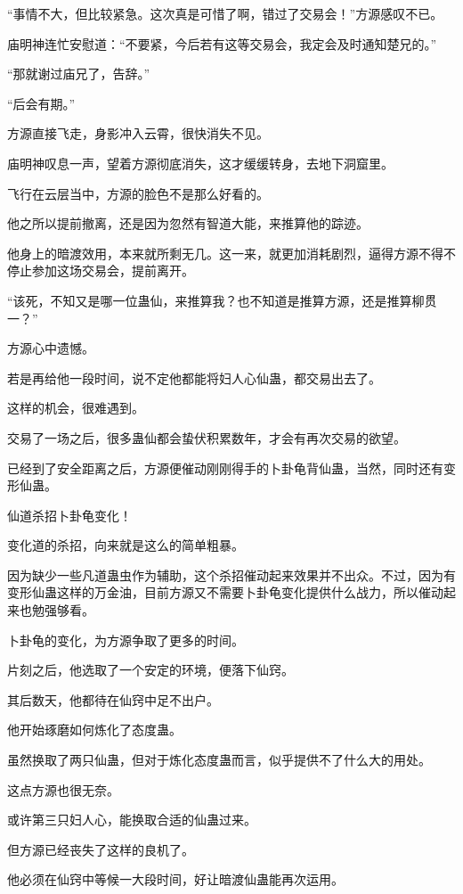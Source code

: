 \begin{this_body}
“事情不大，但比较紧急。这次真是可惜了啊，错过了交易会！”方源感叹不已。

庙明神连忙安慰道：“不要紧，今后若有这等交易会，我定会及时通知楚兄的。”

“那就谢过庙兄了，告辞。”

“后会有期。”

方源直接飞走，身影冲入云霄，很快消失不见。

庙明神叹息一声，望着方源彻底消失，这才缓缓转身，去地下洞窟里。

飞行在云层当中，方源的脸色不是那么好看的。

他之所以提前撤离，还是因为忽然有智道大能，来推算他的踪迹。

他身上的暗渡效用，本来就所剩无几。这一来，就更加消耗剧烈，逼得方源不得不停止参加这场交易会，提前离开。

“该死，不知又是哪一位蛊仙，来推算我？也不知道是推算方源，还是推算柳贯一？”

方源心中遗憾。

若是再给他一段时间，说不定他都能将妇人心仙蛊，都交易出去了。

这样的机会，很难遇到。

交易了一场之后，很多蛊仙都会蛰伏积累数年，才会有再次交易的欲望。

已经到了安全距离之后，方源便催动刚刚得手的卜卦龟背仙蛊，当然，同时还有变形仙蛊。

仙道杀招卜卦龟变化！

变化道的杀招，向来就是这么的简单粗暴。

因为缺少一些凡道蛊虫作为辅助，这个杀招催动起来效果并不出众。不过，因为有变形仙蛊这样的万金油，目前方源又不需要卜卦龟变化提供什么战力，所以催动起来也勉强够看。

卜卦龟的变化，为方源争取了更多的时间。

片刻之后，他选取了一个安定的环境，便落下仙窍。

其后数天，他都待在仙窍中足不出户。

他开始琢磨如何炼化了态度蛊。

虽然换取了两只仙蛊，但对于炼化态度蛊而言，似乎提供不了什么大的用处。

这点方源也很无奈。

或许第三只妇人心，能换取合适的仙蛊过来。

但方源已经丧失了这样的良机了。

他必须在仙窍中等候一大段时间，好让暗渡仙蛊能再次运用。


\end{this_body}
